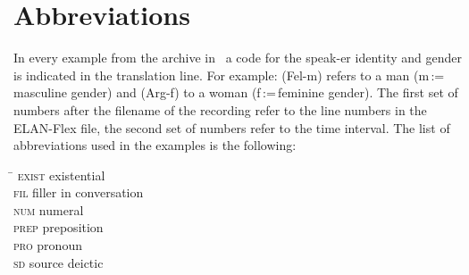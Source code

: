 \documentclass[output=paper
,modfonts
,nonflat]{langsci/langscibook}
\begin{document}
\section*{Abbreviations}\label{sec:abbrev}\largerpage[2]
In every example from the archive in~\citet{Delgado-Galvan2018archive} a code for the speak\hyp{}er identity and gender is indicated in the translation line. For example: (Fel-m) refers to a man (m\,:=\,masculine gender) and (Arg-f) to a woman (f\,:=\,feminine gender). The first set of numbers after the filename of the recording refer to the line numbers in the ELAN-Flex file, the second set of numbers refer to the time interval. The list of abbreviations used in the examples is the following:

\begin{multicols}{2}
	\begin{tabbing}
		\hspace{3em} \= \kill
		\textsc{exist} \> existential \\
		\textsc{fil} \> filler in conversation\\ 
		\textsc{num} \> numeral\\ 
		\textsc{prep} \> preposition\\
		\textsc{pro} \> pronoun\\
		\textsc{sd} \> source deictic\\
	\end{tabbing}
\end{multicols}

{\sloppy\printbibliography[heading=subbibliography,notkeyword=this]}
\end{document}
